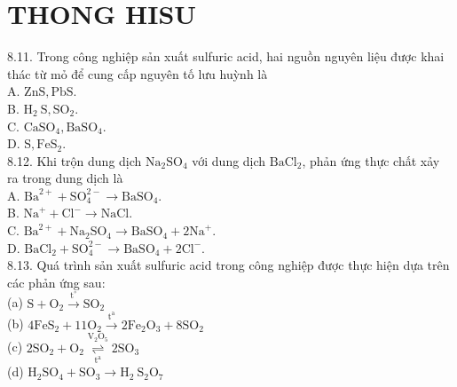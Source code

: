 \documentclass[10pt]{article}
\begin{document}
\section*{THONG HISU}
8.11. Trong công nghiệp sản xuất sulfuric acid, hai nguồn nguyên liệu được khai thác từ mỏ để cung cấp nguyên tố lưu huỳnh là\\
A. $\mathrm{ZnS}, \mathrm{PbS}$.\\
B. $\mathrm{H}_{2} \mathrm{~S}, \mathrm{SO}_{2}$.\\
C. $\mathrm{CaSO}_{4}, \mathrm{BaSO}_{4}$.\\
D. $\mathrm{S}, \mathrm{FeS}_{2}$.\\
8.12. Khi trộn dung dịch $\mathrm{Na}_{2} \mathrm{SO}_{4}$ với dung dịch $\mathrm{BaCl}_{2}$, phản ứng thực chất xảy ra trong dung dịch là\\
A. $\mathrm{Ba}^{2+}+\mathrm{SO}_{4}^{2-} \longrightarrow \mathrm{BaSO}_{4}$.\\
B. $\mathrm{Na}^{+}+\mathrm{Cl}^{-} \longrightarrow \mathrm{NaCl}$.\\
C. $\mathrm{Ba}^{2+}+\mathrm{Na}_{2} \mathrm{SO}_{4} \longrightarrow \mathrm{BaSO}_{4}+2 \mathrm{Na}^{+}$.\\
D. $\mathrm{BaCl}_{2}+\mathrm{SO}_{4}^{2-} \longrightarrow \mathrm{BaSO}_{4}+2 \mathrm{Cl}^{-}$.\\
8.13. Quá trình sản xuất sulfuric acid trong công nghiệp được thực hiện dựa trên các phản ứng sau:\\
(a) $\mathrm{S}+\mathrm{O}_{2} \xrightarrow{\mathrm{t}^{\circ}} \mathrm{SO}_{2}$\\
(b) $4 \mathrm{FeS}_{2}+11 \mathrm{O}_{2} \xrightarrow{\mathrm{t}^{\mathrm{a}}} 2 \mathrm{Fe}_{2} \mathrm{O}_{3}+8 \mathrm{SO}_{2}$\\
(c) $2 \mathrm{SO}_{2}+\mathrm{O}_{2} \underset{\mathrm{t}^{\mathrm{a}}}{\stackrel{\mathrm{V}_{2} \mathrm{O}_{5}}{\rightleftharpoons}} 2 \mathrm{SO}_{3}$\\
(d) $\mathrm{H}_{2} \mathrm{SO}_{4}+\mathrm{SO}_{3} \longrightarrow \mathrm{H}_{2} \mathrm{~S}_{2} \mathrm{O}_{7}$
\end{document}
